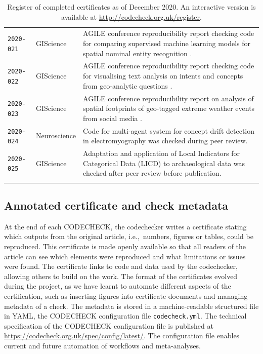 \documentclass[12pt]{article}
\begin{document}
\begin{table}
\begin{tabular}{llp{12cm}}
    \texttt{2020-021}  \cite{cert-2020-021} & GIScience & AGILE conference reproducibility report checking code for comparing supervised machine learning models for spatial nominal entity recognition \cite{Medad2020}. \\ %
    \texttt{2020-022}  \cite{cert-2020-022} & GIScience & AGILE conference reproducibility report checking code for visualising text analysis on intents and concepts from geo-analytic questions \cite{Xu2020}. \\ %
    \texttt{2020-023}  \cite{cert-2020-023} & GIScience & AGILE conference reproducibility report on analysis of spatial footprints of geo-tagged extreme weather events from social media \cite{Owuor2020}. \\
    \texttt{2020-024}  \cite{cert-2020-024} & Neuroscience & Code for multi-agent system for concept drift detection in electromyography \cite{vieira_driftage_2020} was checked during peer review. \\ %
    \texttt{2020-025}  \cite{cert-2020-025} & GIScience & Adaptation and application of Local Indicators for Categorical Data (LICD) to archaeological data \cite{carrer_application_2021} was checked after peer review before publication. \\ %
    \\ \bottomrule
  \end{tabular}
  \caption{Register of completed certificates as of December 2020. An interactive version
  is available at \url{http://codecheck.org.uk/register}.
  }
  \label{tab:register}
\end{table}

\subsection*{Annotated certificate and check metadata}\label{annotated-certificate}

At the end of each CODECHECK, the codechecker writes a certificate
stating which outputs from the original article, i.e.,~numbers,
figures or tables, could be reproduced.  This certificate is made
openly available so that all readers of the article can see which
elements were reproduced and what limitations or issues were found.
The certificate links to code and data used by the codechecker,
allowing others to build on the work.  The format of the certificates
evolved during the project, as we have learnt to automate different
aspects of the certification, such as inserting figures into
certificate documents and managing metadata of a check.  The metadata
is stored in a machine-readable structured file in YAML, the CODECHECK
configuration file \texttt{codecheck.yml}.
The technical specification of the CODECHECK configuration file is
published at \url{https://codecheck.org.uk/spec/config/latest/}.  The
configuration file enables current and future automation of workflows
and meta-analyses.
\end{document}
